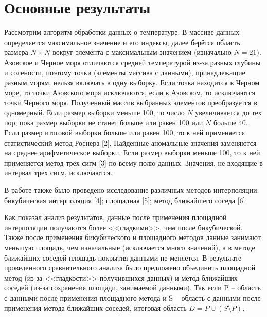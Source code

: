 \section{Основные результаты} %

Рассмотрим алгоритм обработки данных о температуре. В массиве данных определяется максимальное значение и его индексы, далее берётся область размера $N\times N$ вокруг элемента с максимальным значением (изначально $N = 21$). Азовское и Черное моря отличаются средней температурой из-за разных глубины и солености, поэтому точки (элементы массива с данными), принадлежащие разным морям, нельзя включать в одну выборку.  Если точка находится в Черном море, то точки Азовского моря исключаются, если в Азовском, то исключаются точки Черного моря. Полученный массив выбранных элементов преобразуется в одномерный. Если размер выборки меньше 100, то число $N$ увеличивается до тех пор, пока размер выборки не станет больше или равен 100 или $N$ больше 40. 
Если размер итоговой выборки больше или равен 100, то к ней применяется статистический метод Роснера [2]. Найденные аномальные значения заменяются на среднее арифметическое выборки. Если размер выборки меньше 100, то к ней применяется метод трёх сигм [3] по всему полю данных. Значения, не входящие в интервал трех сигм, исключаются.


  


В работе также было проведено исследование различных методов интерполяции: 
	бикубическая интерполяция [4];
	площадная [5];
	метод ближайшего соседа [6].

Как показал анализ результатов, данные после применения площадной интерполяции получаются более <<гладкими>>, чем после бикубической. Также после применения бикубического и площадного методов данные занимают меньшую площадь, чем изначальные (исключается много значений), а в методе ближайших соседей площадь покрытия данными не меняется.
В результате проведенного сравнительного анализа было предложено объединить площадной метод (из-за <<гладкости>> получившихся данных) и метод ближайших соседей (из-за сохранения площади, занимаемой данными). Так если P -- область с данными после применения площадного метода и S -- область с данными после применения метода ближайших соседей, итоговая область $D = P \cup (S \setminus P)$.

